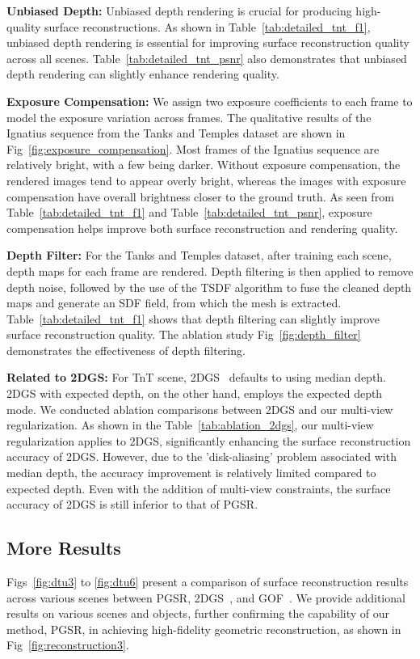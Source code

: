\textbf{Unbiased Depth:}
Unbiased depth rendering is crucial for producing high-quality surface reconstructions. As shown in Table~\ref{tab:detailed_tnt_f1}, unbiased depth rendering is essential for improving surface reconstruction quality across all scenes. Table~\ref{tab:detailed_tnt_psnr} also demonstrates that unbiased depth rendering can slightly enhance rendering quality.

\textbf{Exposure Compensation:}
We assign two exposure coefficients to each frame to model the exposure variation across frames. The qualitative results of the Ignatius sequence from the Tanks and Temples dataset are shown in Fig~\ref{fig:exposure_compensation}. Most frames of the Ignatius sequence are relatively bright, with a few being darker. Without exposure compensation, the rendered images tend to appear overly bright, whereas the images with exposure compensation have overall brightness closer to the ground truth. As seen from Table~\ref{tab:detailed_tnt_f1} and Table~\ref{tab:detailed_tnt_psnr}, exposure compensation helps improve both surface reconstruction and rendering quality.

\textbf{Depth Filter:}
For the Tanks and Temples dataset, after training each scene, depth maps for each frame are rendered. Depth filtering is then applied to remove depth noise, followed by the use of the TSDF algorithm to fuse the cleaned depth maps and generate an SDF field, from which the mesh is extracted. Table~\ref{tab:detailed_tnt_f1} shows that depth filtering can slightly improve surface reconstruction quality. The ablation study Fig~\ref{fig:depth_filter} demonstrates the effectiveness of depth filtering.

\textbf{Related to 2DGS:}
For TnT scene, 2DGS~\cite{huang20242d} defaults to using median depth. 2DGS with expected depth, on the other hand, employs the expected depth mode. We conducted ablation comparisons between 2DGS and our multi-view regularization. As shown in the Table~\ref{tab:ablation_2dgs}, our multi-view regularization applies to 2DGS, significantly enhancing the surface reconstruction accuracy of 2DGS. However, due to the 'disk-aliasing' problem associated with median depth, the accuracy improvement is relatively limited compared to expected depth. Even with the addition of multi-view constraints, the surface accuracy of 2DGS is still inferior to that of PGSR.

\color{black}
\subsection{More Results}
Figs~\ref{fig:dtu3} to \ref{fig:dtu6} present a comparison of surface reconstruction results across various scenes between PGSR, 2DGS~\cite{huang20242d}, and GOF~\cite{yu2024gaussian}. We provide additional results on various scenes and objects, further confirming the capability of our method, PGSR, in achieving high-fidelity geometric reconstruction, as shown in Fig~\ref{fig:reconstruction3}.

